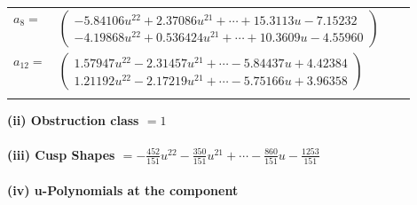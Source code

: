 \documentclass[1p]{elsarticle_modified}
\theoremstyle{definition}
\begin{document}
\begin{tabular}{m{7pt} m{180pt} m{7pt} m{180pt} }
\flushright $a_{8}=$&$\begin{pmatrix}-5.84106 u^{22}+2.37086 u^{21}+\cdots+15.3113 u-7.15232\\-4.19868 u^{22}+0.536424 u^{21}+\cdots+10.3609 u-4.55960\end{pmatrix}$ \\
\flushright $a_{12}=$&$\begin{pmatrix}1.57947 u^{22}-2.31457 u^{21}+\cdots-5.84437 u+4.42384\\1.21192 u^{22}-2.17219 u^{21}+\cdots-5.75166 u+3.96358\end{pmatrix}$\\&\end{tabular}
\flushleft \textbf{(ii) Obstruction class $= 1$}\\~\\
\flushleft \textbf{(iii) Cusp Shapes $= -\frac{452}{151} u^{22}-\frac{350}{151} u^{21}+\cdots-\frac{860}{151} u-\frac{1253}{151}$}\\~\\
\newpage\renewcommand{\arraystretch}{1}
\flushleft \textbf{(iv) u-Polynomials at the component}\newline \\
\end{document}
